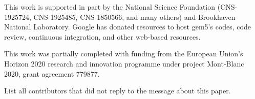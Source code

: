 \documentclass[manuscript, review, screen, timestamp]{acmart}
\begin{document}
This work is supported in part by the National Science Foundation (CNS-1925724, CNS-1925485, CNS-1850566, and many others) and Brookhaven National Laboratory.
Google has donated resources to host gem5's codes, code review, continuous integration, and other web-based resources.

This work was partially completed with funding from the European Union's Horizon 2020 research and innovation programme under project Mont-Blanc 2020, grant agreement 779877.

List all contributors that did not reply to the message about this paper.



\end{document}
